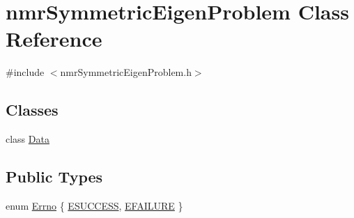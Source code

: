 \hypertarget{classnmr_symmetric_eigen_problem}{\section{nmr\-Symmetric\-Eigen\-Problem Class Reference}
\label{classnmr_symmetric_eigen_problem}
}


{\ttfamily \#include $<$nmr\-Symmetric\-Eigen\-Problem.\-h$>$}

\subsection*{Classes}
\begin{DoxyCompactItemize}
\item 
class \hyperlink{classnmr_symmetric_eigen_problem_1_1_data}{Data}
\end{DoxyCompactItemize}
\subsection*{Public Types}
\begin{DoxyCompactItemize}
\item 
enum \hyperlink{classnmr_symmetric_eigen_problem_a74a598587dbf205ee28575c65b2d3879}{Errno} \{ \hyperlink{classnmr_symmetric_eigen_problem_a74a598587dbf205ee28575c65b2d3879af116cf3f848f81de1a2cdb23f1bf06cb}{E\-S\-U\-C\-C\-E\-S\-S}, 
\hyperlink{classnmr_symmetric_eigen_problem_a74a598587dbf205ee28575c65b2d3879ab95e43dccc12a4aded9c7e68bec2ef1d}{E\-F\-A\-I\-L\-U\-R\-E}
 \}
\end{DoxyCompactItemize}


